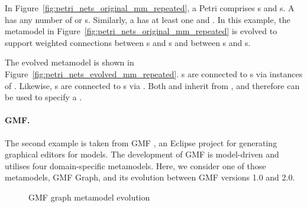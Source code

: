 In Figure~\ref{fig:petri_nets_original_mm_repeated}, a Petri  comprises s and s. A  has any number of  or  s. Similarly, a  has at least one  and  . In this example, the metamodel in Figure~\ref{fig:petri_nets_original_mm_repeated} is evolved to support weighted connections between s and s and between s and s.

The evolved metamodel is shown in Figure~\ref{fig:petri_nets_evolved_mm_repeated}. s are connected to s via instances of . Likewise, s are connected to s via . Both  and  inherit from , and therefore can be used to specify a .

\paragraph{GMF.}
The second example is taken from GMF \cite{gronback09emp}, an Eclipse project for generating graphical editors for models. The development of GMF is model-driven and utilises four domain-specific metamodels. Here, we consider one of those metamodels, GMF Graph, and its evolution between GMF versions 1.0 and 2.0. 

\begin{figure}[htbp]
	\centering
	\caption{GMF graph metamodel evolution}
\label{fig:gmf_graph_mms}
\end{figure}

